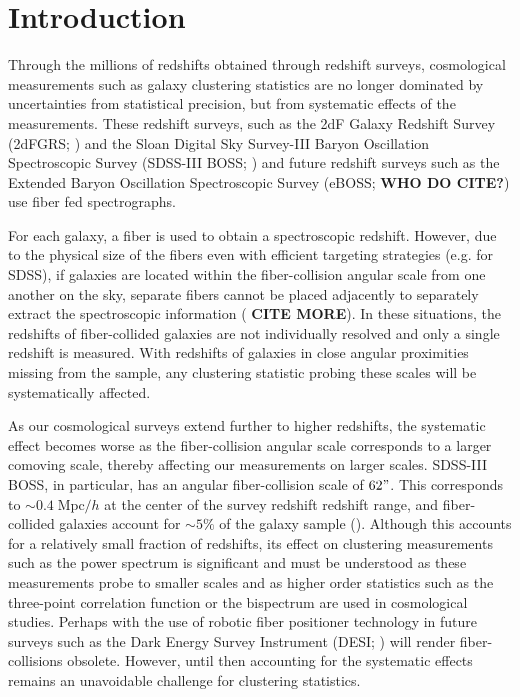 \documentclass{emulateapj}
\begin{document}
\section{Introduction} 
Through the millions of redshifts obtained through redshift surveys, cosmological measurements such as galaxy clustering statistics are no longer dominated by uncertainties from statistical precision, but from systematic effects of the measurements. These redshift surveys, such as the 2dF Galaxy Redshift Survey (2dFGRS; \citealt{Colless:1999aa}) and the Sloan Digital Sky Survey-III Baryon Oscillation Spectroscopic Survey (SDSS-III BOSS; \citealt{Anderson:2012aa, Dawson:2013aa}) and future redshift surveys such as the Extended Baryon Oscillation Spectroscopic Survey (eBOSS; {\bf WHO DO CITE?}) use fiber fed spectrographs. 

For each galaxy, a fiber is used to obtain a spectroscopic redshift. However, due to the physical size of the fibers even with efficient targeting strategies (e.g. \citealt{Blanton:2003ab} for SDSS), if galaxies are located within the fiber-collision angular scale from one another on the sky, separate fibers cannot be placed adjacently to separately extract the spectroscopic information (\citealt{Yoon:2008aa} {\bf CITE MORE}). In these situations, the redshifts of fiber-collided galaxies are not individually resolved and only a single redshift is measured. With redshifts of galaxies in close angular proximities missing from the sample, any clustering statistic probing these scales will be systematically affected. 

As our cosmological surveys extend further to higher redshifts, the systematic effect becomes worse as the fiber-collision angular scale corresponds to a larger comoving scale, thereby affecting our measurements on larger scales. SDSS-III BOSS, in particular, has an angular fiber-collision scale of $62"$. This corresponds to $\sim 0.4 \;\mathrm{Mpc}/h$ at the center of the survey redshift redshift range, and fiber-collided galaxies account for $\sim 5\%$ of the galaxy sample (\citealt{Anderson:2012aa}). Although this accounts for a relatively small fraction of redshifts, its effect on clustering measurements such as the power spectrum is significant and must be understood as these measurements probe to smaller scales and as higher order statistics such as the three-point correlation function or the bispectrum are used in cosmological studies. Perhaps with the use of robotic fiber positioner technology in future surveys such as the Dark Energy Survey Instrument (DESI; \citealt{Schlegel:2011aa, Morales:2012aa, Makarem:2014aa}) will render fiber-collisions obsolete. However, until then accounting for the systematic effects remains an unavoidable challenge for clustering statistics. 
\end{document}
